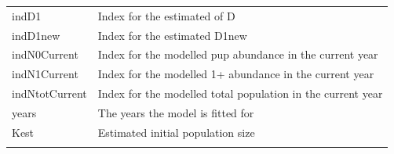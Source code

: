 \documentclass[
]{article}
\begin{document}
\begin{longtable}[]{@{}ll@{}}
\begin{minipage}[t]{0.31\columnwidth}
indD1\strut
\end{minipage} & \begin{minipage}[t]{0.38\columnwidth}\raggedright
Index for the estimated of D\strut
\end{minipage}\tabularnewline
\begin{minipage}[t]{0.31\columnwidth}\raggedright
indD1new\strut
\end{minipage} & \begin{minipage}[t]{0.38\columnwidth}\raggedright
Index for the estimated D1new\strut
\end{minipage}\tabularnewline
\begin{minipage}[t]{0.31\columnwidth}\raggedright
indN0Current\strut
\end{minipage} & \begin{minipage}[t]{0.38\columnwidth}\raggedright
Index for the modelled pup abundance in the current year\strut
\end{minipage}\tabularnewline
\begin{minipage}[t]{0.31\columnwidth}\raggedright
indN1Current\strut
\end{minipage} & \begin{minipage}[t]{0.38\columnwidth}\raggedright
Index for the modelled 1+ abundance in the current year\strut
\end{minipage}\tabularnewline
\begin{minipage}[t]{0.31\columnwidth}\raggedright
indNtotCurrent\strut
\end{minipage} & \begin{minipage}[t]{0.38\columnwidth}\raggedright
Index for the modelled total population in the current year\strut
\end{minipage}\tabularnewline
\begin{minipage}[t]{0.31\columnwidth}\raggedright
years\strut
\end{minipage} & \begin{minipage}[t]{0.38\columnwidth}\raggedright
The years the model is fitted for\strut
\end{minipage}\tabularnewline
\begin{minipage}[t]{0.31\columnwidth}\raggedright
Kest\strut
\end{minipage} & \begin{minipage}[t]{0.38\columnwidth}\raggedright
Estimated initial population size\strut
\end{minipage}\tabularnewline
\begin{minipage}[t]{0.31\columnwidth}\raggedright

\end{minipage}
\end{longtable}
\end{document}
